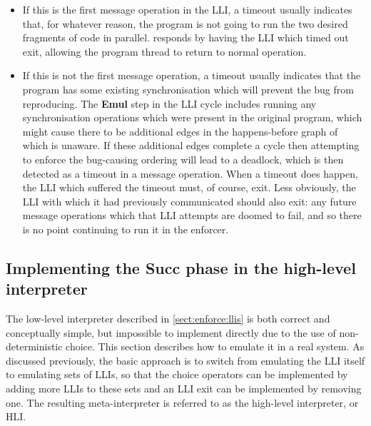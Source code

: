 \begin{itemize}
\item
  If this is the first message operation in the LLI, a timeout usually
  indicates that, for whatever reason, the program is not going to run
  the two desired fragments of code in parallel.  {\Technique}
  responds by having the LLI which timed out exit, allowing the
  program thread to return to normal operation.

\item
  If this is not the first message operation, a timeout usually
  indicates that the program has some existing synchronisation which
  will prevent the bug from reproducing.  The \textbf{Emul} step in
  the LLI cycle includes running any synchronisation operations which
  were present in the original program, which might cause there to be
  additional edges in the happens-before graph of which {\technique}
  is unaware.  If these additional edges complete a cycle then
  attempting to enforce the bug-causing ordering will lead to a
  deadlock, which is then detected as a timeout in a message
  operation.  When a timeout does happen, the LLI which suffered the
  timeout must, of course, exit.  Less obviously, the LLI with which
  it had previously communicated should also exit: any future message
  operations which that LLI attempts are doomed to fail, and so there
  is no point continuing to run it in the enforcer.
\end{itemize}


\subsection{Implementing the \textbf{Succ} phase in the high-level interpreter}
\label{sect:enforce:succ}

The low-level interpreter described in \autoref{sect:enforce:llis}
is both correct and conceptually simple, but impossible to implement
directly due to the use of non-deterministic choice.  This section
describes how to emulate it in a real system.  As discussed
previously, the basic approach is to switch from emulating the LLI
itself to emulating sets of LLIs, so that the choice operators can be
implemented by adding more LLIs to these sets and an LLI exit can be
implemented by removing one.  The resulting meta-interpreter is
referred to as the high-level interpreter, or HLI.


